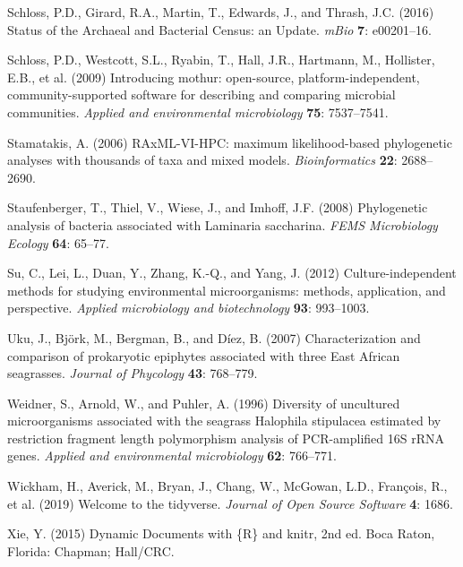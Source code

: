 \documentclass[12pt,]{article}
\begin{document}
\leavevmode\hypertarget{ref-Schloss2016}{}%
Schloss, P.D., Girard, R.A., Martin, T., Edwards, J., and Thrash, J.C.
(2016) Status of the Archaeal and Bacterial Census: an Update.
\emph{mBio} \textbf{7}: e00201--16.

\leavevmode\hypertarget{ref-Schloss2009}{}%
Schloss, P.D., Westcott, S.L., Ryabin, T., Hall, J.R., Hartmann, M.,
Hollister, E.B., et al. (2009) Introducing mothur: open-source,
platform-independent, community-supported software for describing and
comparing microbial communities. \emph{Applied and environmental
microbiology} \textbf{75}: 7537--7541.

\leavevmode\hypertarget{ref-Stamatakis2006}{}%
Stamatakis, A. (2006) RAxML-VI-HPC: maximum likelihood-based
phylogenetic analyses with thousands of taxa and mixed models.
\emph{Bioinformatics} \textbf{22}: 2688--2690.

\leavevmode\hypertarget{ref-Staufenberger2008}{}%
Staufenberger, T., Thiel, V., Wiese, J., and Imhoff, J.F. (2008)
Phylogenetic analysis of bacteria associated with Laminaria saccharina.
\emph{FEMS Microbiology Ecology} \textbf{64}: 65--77.

\leavevmode\hypertarget{ref-Su2012}{}%
Su, C., Lei, L., Duan, Y., Zhang, K.-Q., and Yang, J. (2012)
Culture-independent methods for studying environmental microorganisms:
methods, application, and perspective. \emph{Applied microbiology and
biotechnology} \textbf{93}: 993--1003.

\leavevmode\hypertarget{ref-Uku2007}{}%
Uku, J., Björk, M., Bergman, B., and Díez, B. (2007) Characterization
and comparison of prokaryotic epiphytes associated with three East
African seagrasses. \emph{Journal of Phycology} \textbf{43}: 768--779.

\leavevmode\hypertarget{ref-Weidner1996}{}%
Weidner, S., Arnold, W., and Puhler, A. (1996) Diversity of uncultured
microorganisms associated with the seagrass Halophila stipulacea
estimated by restriction fragment length polymorphism analysis of
PCR-amplified 16S rRNA genes. \emph{Applied and environmental
microbiology} \textbf{62}: 766--771.

\leavevmode\hypertarget{ref-Wickham2019}{}%
Wickham, H., Averick, M., Bryan, J., Chang, W., McGowan, L.D., François,
R., et al. (2019) Welcome to the tidyverse. \emph{Journal of Open Source
Software} \textbf{4}: 1686.

\leavevmode\hypertarget{ref-Xie2015}{}%
Xie, Y. (2015) Dynamic Documents with \{R\} and knitr, 2nd ed. Boca
Raton, Florida: Chapman; Hall/CRC.
\end{document}
